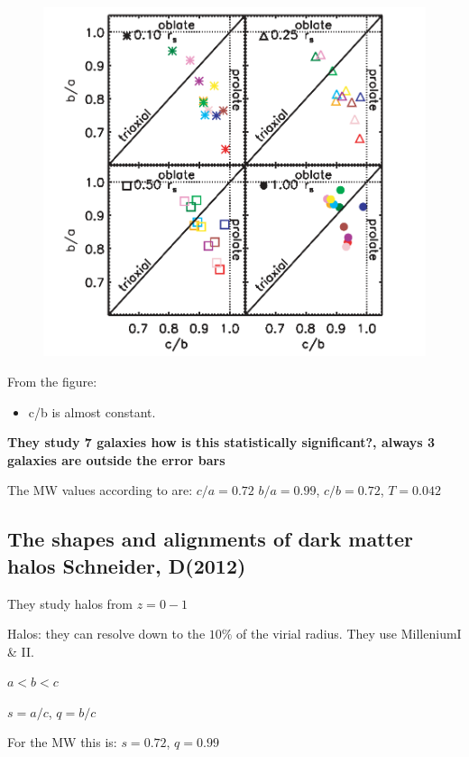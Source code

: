 \begin{figure}[H]
\centering
\includegraphics[scale=0.5]{prolateoblatehayashi.png}
\end{figure}


From the figure:

\begin{itemize}
\item c/b is almost constant. 
\end{itemize}

\textbf{They study 7 galaxies how is this statistically significant?, always 3 galaxies are outside the error bars }

The MW values according to \citep{Law10} are: $c/a = 0.72$ $b/a = 0.99$, $c/b = 0.72$, $T=0.042$

\subsection{The shapes and alignments of dark matter halos Schneider, D(2012)}

They study halos from $z=0-1$

Halos: they can resolve down to the $10\%$ of the virial radius. They use MilleniumI \& II.

$a<b<c$

$s=a/c$, $q=b/c$
  
For the MW this is: $s = 0.72 $, $q = 0.99 $


